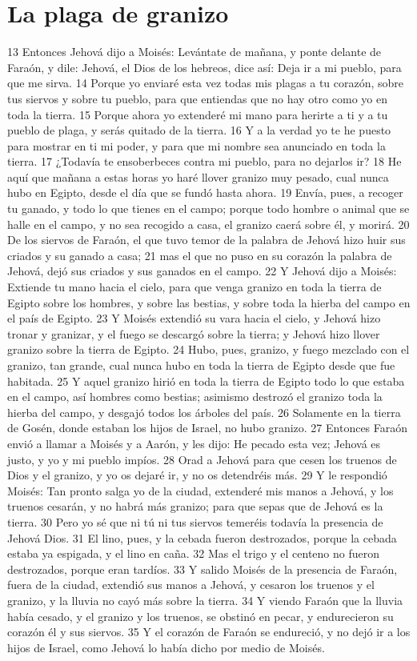 \section{La plaga de granizo}
13 Entonces Jehová dijo a Moisés: Levántate de mañana, y ponte delante de Faraón, y dile: Jehová, el Dios de los hebreos, dice así: Deja ir a mi pueblo, para que me sirva.
14 Porque yo enviaré esta vez todas mis plagas a tu corazón, sobre tus siervos y sobre tu pueblo, para que entiendas que no hay otro como yo en toda la tierra.
15 Porque ahora yo extenderé mi mano para herirte a ti y a tu pueblo de plaga, y serás quitado de la tierra.
16 Y a la verdad yo te he puesto para mostrar en ti mi poder, y para que mi nombre sea anunciado en toda la tierra.
17 ¿Todavía te ensoberbeces contra mi pueblo, para no dejarlos ir?
18 He aquí que mañana a estas horas yo haré llover granizo muy pesado, cual nunca hubo en Egipto, desde el día que se fundó hasta ahora.
19 Envía, pues, a recoger tu ganado, y todo lo que tienes en el campo; porque todo hombre o animal que se halle en el campo, y no sea recogido a casa, el granizo caerá sobre él, y morirá.
20 De los siervos de Faraón, el que tuvo temor de la palabra de Jehová hizo huir sus criados y su ganado a casa;
21 mas el que no puso en su corazón la palabra de Jehová, dejó sus criados y sus ganados en el campo.
22 Y Jehová dijo a Moisés: Extiende tu mano hacia el cielo, para que venga granizo en toda la tierra de Egipto sobre los hombres, y sobre las bestias, y sobre toda la hierba del campo en el país de Egipto.
23 Y Moisés extendió su vara hacia el cielo, y Jehová hizo tronar y granizar, y el fuego se descargó sobre la tierra; y Jehová hizo llover granizo sobre la tierra de Egipto.
24 Hubo, pues, granizo, y fuego mezclado con el granizo, tan grande, cual nunca hubo en toda la tierra de Egipto desde que fue habitada.
25 Y aquel granizo hirió en toda la tierra de Egipto todo lo que estaba en el campo, así hombres como bestias; asimismo destrozó el granizo toda la hierba del campo, y desgajó todos los árboles del país.
26 Solamente en la tierra de Gosén, donde estaban los hijos de Israel, no hubo granizo.
27 Entonces Faraón envió a llamar a Moisés y a Aarón, y les dijo: He pecado esta vez; Jehová es justo, y yo y mi pueblo impíos.
28 Orad a Jehová para que cesen los truenos de Dios y el granizo, y yo os dejaré ir, y no os detendréis más.
29 Y le respondió Moisés: Tan pronto salga yo de la ciudad, extenderé mis manos a Jehová, y los truenos cesarán, y no habrá más granizo; para que sepas que de Jehová es la tierra.
30 Pero yo sé que ni tú ni tus siervos temeréis todavía la presencia de Jehová Dios.
31 El lino, pues, y la cebada fueron destrozados, porque la cebada estaba ya espigada, y el lino en caña.
32 Mas el trigo y el centeno no fueron destrozados, porque eran tardíos.
33 Y salido Moisés de la presencia de Faraón, fuera de la ciudad, extendió sus manos a Jehová, y cesaron los truenos y el granizo, y la lluvia no cayó más sobre la tierra.
34 Y viendo Faraón que la lluvia había cesado, y el granizo y los truenos, se obstinó en pecar, y endurecieron su corazón él y sus siervos.
35 Y el corazón de Faraón se endureció, y no dejó ir a los hijos de Israel, como Jehová lo había dicho por medio de Moisés.

